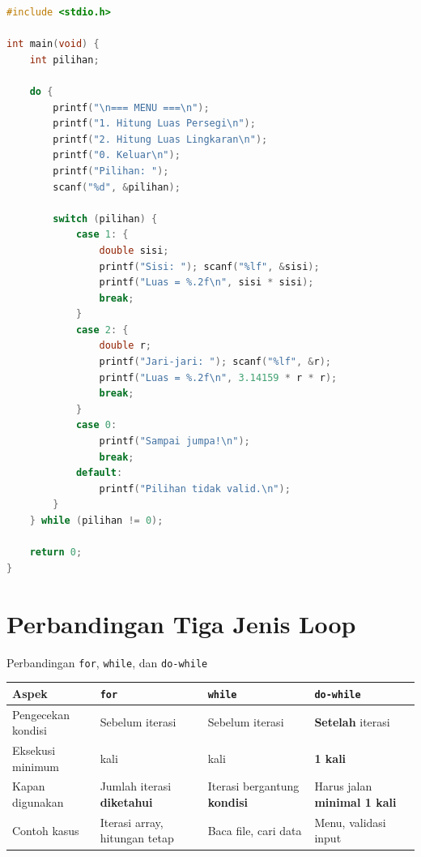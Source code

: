 \documentclass[../main.tex]{subfiles}
\begin{document}
\begin{lstlisting}[language=C,caption=Menu interaktif dengan \texttt{do-while}]
#include <stdio.h>

int main(void) {
    int pilihan;
    
    do {
        printf("\n=== MENU ===\n");
        printf("1. Hitung Luas Persegi\n");
        printf("2. Hitung Luas Lingkaran\n");
        printf("0. Keluar\n");
        printf("Pilihan: ");
        scanf("%d", &pilihan);
        
        switch (pilihan) {
            case 1: {
                double sisi;
                printf("Sisi: "); scanf("%lf", &sisi);
                printf("Luas = %.2f\n", sisi * sisi);
                break;
            }
            case 2: {
                double r;
                printf("Jari-jari: "); scanf("%lf", &r);
                printf("Luas = %.2f\n", 3.14159 * r * r);
                break;
            }
            case 0:
                printf("Sampai jumpa!\n");
                break;
            default:
                printf("Pilihan tidak valid.\n");
        }
    } while (pilihan != 0);
    
    return 0;
}
\end{lstlisting}



\section{Perbandingan Tiga Jenis Loop}

\begin{modultable}[]{Perbandingan \texttt{for}, \texttt{while}, dan \texttt{do-while}}
{\small
\begin{tabular}{|>{\raggedright\arraybackslash}p{2.4cm}|>{\raggedright\arraybackslash}p{3.2cm}|>{\raggedright\arraybackslash}p{3.2cm}|>{\raggedright\arraybackslash}p{3.2cm}|}
\hline
\textbf{Aspek} & \texttt{\textbf{for}} & \texttt{\textbf{while}} & \texttt{\textbf{do-while}} \\
\hline
Pengecekan kondisi & Sebelum iterasi & Sebelum iterasi & \textbf{Setelah} iterasi \\
\hline
Eksekusi minimum & 0 kali & 0 kali & \textbf{1 kali} \\
\hline
Kapan digunakan & Jumlah iterasi \textbf{diketahui} & Iterasi bergantung \textbf{kondisi} & Harus jalan \textbf{minimal 1 kali} \\
\hline
Contoh kasus & Iterasi array, hitungan tetap & Baca file, cari data & Menu, validasi input \\
\hline
\end{tabular}
}
\end{modultable}
\end{document}
